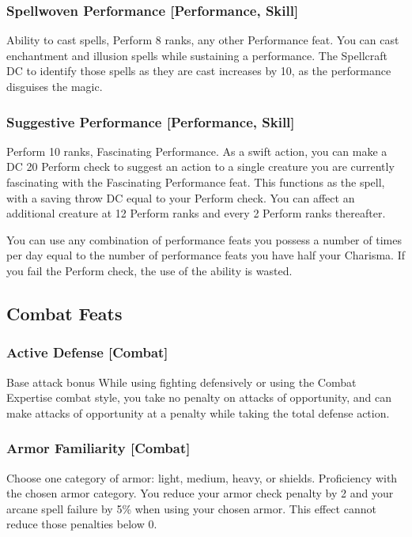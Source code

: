 \subsubsection{Spellwoven Performance [Performance, Skill]}
\featpre Ability to cast spells, Perform 8 ranks, any other Performance feat.
\featben You can cast enchantment and illusion spells while sustaining a performance. The Spellcraft DC to identify those spells as they are cast increases by 10, as the performance disguises the magic.

\subsubsection{Suggestive Performance [Performance, Skill]}
\featpre Perform 10 ranks, Fascinating Performance.
\featben As a swift action, you can make a DC 20 Perform check to suggest an action to a single creature you are currently fascinating with the Fascinating Performance feat. This functions as the  spell, with a saving throw DC equal to your Perform check. You can affect an additional creature at 12 Perform ranks and every 2 Perform ranks thereafter.

You can use any combination of performance feats you possess a number of times per day equal to the number of performance feats you have \add half your Charisma. If you fail the Perform check, the use of the ability is wasted.

\subsection{Combat Feats}

\subsubsection{Active Defense [Combat]}
 Base attack bonus 
 While using fighting defensively or using the Combat Expertise combat style, you take no penalty on attacks of opportunity, and can make attacks of opportunity at a  penalty while taking the total defense action.

\subsubsection{Armor Familiarity [Combat]}
Choose one category of armor: light, medium, heavy, or shields.
 Proficiency with the chosen armor category.
 You reduce your armor check penalty by 2 and your arcane spell failure by 5\% when using your chosen armor. This effect cannot reduce those penalties below 0.

